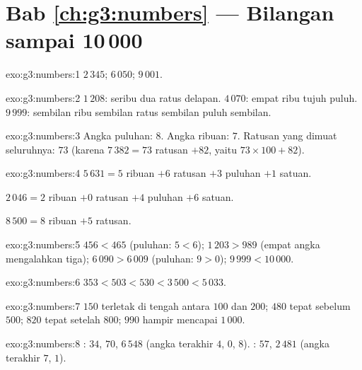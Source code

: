 \section*{Bab \ref{ch:g3:numbers} --- Bilangan sampai 10\,000}

\begin{solution}{exo:g3:numbers:1}
$2\,345$; \quad $6\,050$; \quad $9\,001$.
\end{solution}

\begin{solution}{exo:g3:numbers:2}
$1\,208$: seribu dua ratus delapan. \quad
$4\,070$: empat ribu tujuh puluh. \quad
$9\,999$: sembilan ribu sembilan ratus sembilan puluh sembilan.
\end{solution}

\begin{solution}{exo:g3:numbers:3}
Angka puluhan: $8$. Angka ribuan: $7$. Ratusan yang dimuat
seluruhnya: $73$ (karena $7\,382 = 73$ ratusan $+ 82$, yaitu
$73 \times 100 + 82$).
\end{solution}

\begin{solution}{exo:g3:numbers:4}
$5\,631 = 5$ ribuan $+ 6$ ratusan $+ 3$ puluhan $+ 1$ satuan.

$2\,046 = 2$ ribuan $+ 0$ ratusan $+ 4$ puluhan $+ 6$ satuan.

$8\,500 = 8$ ribuan $+ 5$ ratusan.
\end{solution}

\begin{solution}{exo:g3:numbers:5}
$456 < 465$ (puluhan: $5 < 6$); \quad
$1\,203 > 989$ (empat angka mengalahkan tiga); \quad
$6\,090 > 6\,009$ (puluhan: $9 > 0$); \quad
$9\,999 < 10\,000$.
\end{solution}

\begin{solution}{exo:g3:numbers:6}
$353 < 503 < 530 < 3\,500 < 5\,033$.
\end{solution}

\begin{solution}{exo:g3:numbers:7}
$150$ terletak di tengah antara $100$ dan $200$; $480$ tepat sebelum
$500$; $820$ tepat setelah $800$; $990$ hampir mencapai $1\,000$.
\end{solution}

\begin{solution}{exo:g3:numbers:8}
: $34$, $70$, $6\,548$ (angka terakhir $4$, $0$, $8$). :
$57$, $2\,481$ (angka terakhir $7$, $1$).
\end{solution}


